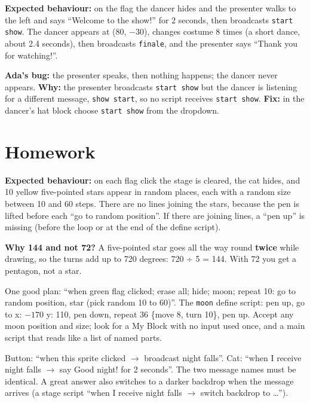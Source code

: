 \begin{answer}
\textbf{Expected behaviour:} on the flag the dancer hides and the presenter walks to the left and says \enquote{Welcome to the show!} for 2 seconds, then broadcasts \texttt{start show}. The dancer appears at (80, $-30$), changes costume 8 times (a short dance, about 2.4 seconds), then broadcasts \texttt{finale}, and the presenter says \enquote{Thank you for watching!}.

\textbf{Ada's bug:} the presenter speaks, then nothing happens; the dancer never appears. \textbf{Why:} the presenter broadcasts \texttt{start show} but the dancer is listening for a different message, \texttt{show start}, so no script receives \texttt{start show}. \textbf{Fix:} in the dancer's hat block choose \texttt{start show} from the dropdown.
\end{answer}

\section{Homework}
\begin{answer}
\textbf{Expected behaviour:} on each flag click the stage is cleared, the cat hides, and 10 yellow five-pointed stars appear in random places, each with a random size between 10 and 60 steps. There are no lines joining the stars, because the pen is lifted before each \enquote{go to random position}. If there are joining lines, a \enquote{pen up} is missing (before the loop or at the end of the define script).

\textbf{Why 144 and not 72?} A five-pointed star goes all the way round \textbf{twice} while drawing, so the turns add up to 720 degrees: 720 ÷ 5 = 144. With 72 you get a pentagon, not a star.
\end{answer}

\begin{answer}
One good plan: \enquote{when green flag clicked; erase all; hide; moon; repeat 10: go to random position, star (pick random 10 to 60)}. The \texttt{moon} define script: pen up, go to x: $-170$ y: 110, pen down, repeat 36 \{move 8, turn 10\}, pen up. Accept any moon position and size; look for a My Block with no input used once, and a main script that reads like a list of named parts.
\end{answer}

\begin{answer}
Button: \enquote{when this sprite clicked $\rightarrow$ broadcast night falls}. Cat: \enquote{when I receive night falls $\rightarrow$ say Good night! for 2 seconds}. The two message names must be identical. A great answer also switches to a darker backdrop when the message arrives (a stage script \enquote{when I receive night falls $\rightarrow$ switch backdrop to \ldots}).
\end{answer}

